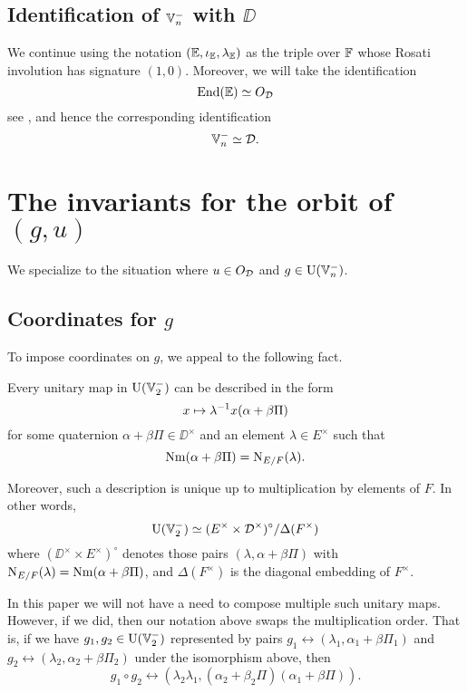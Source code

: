 \subsection{Identification of $\mathbb V_n^-$ with $\DD$}
We continue using the notation $(\mathbb E, \iota_\mathbb E, \lambda_\mathbb E)$ as the triple over $\mathbb F$
whose Rosati involution has signature $(1,0)$.
Moreover, we will take the identification
\[ \operatorname{End}(\mathbb E) \simeq O_\mathcal D \]
see \cite[Remark 2.5]{ref:KR},
and hence the corresponding identification
\[ \mathbb V_n^- \simeq \mathcal D. \]

\section{The invariants for the orbit of $(g,u)$}
\label{sec:g_u_invariants}

We specialize to the situation where $u \in O_\mathcal D$ and $g \in \operatorname{U}(\mathbb V_n^-)$.

\subsection{Coordinates for $g$}
To impose coordinates on $g$, we appeal to the following fact.
\begin{lemma}
  [Description of $\U(\VV_2^-)$]
  Every unitary map in $\U(\VV_2^-)$ can be described in the form
  \[ x \mapsto \lambda^{-1} x (\alpha + \beta \Pi) \]
  for some quaternion $\alpha + \beta \Pi \in \DD^\times$
  and an element $\lambda \in E^\times$ such that
  \[ \operatorname{Nm}(\alpha + \beta \Pi) = \operatorname{N}_{E/F}(\lambda). \]

  Moreover, such a description is unique up to multiplication by elements of $F$.
  In other words,
  \[ \operatorname{U}(\mathbb V_2^-) \simeq (E^\times \times \mathcal D^\times)^\circ / \Delta(F^\times) \]
  where $(\DD^\times \times E^\times)^\circ$
  denotes those pairs $(\lambda, \alpha + \beta \Pi)$
  with $\operatorname{N}_{E/F}(\lambda) = \operatorname{Nm}(\alpha + \beta \Pi)$,
  and $\Delta(F^\times)$ is the diagonal embedding of $F^\times$.
\end{lemma}
\begin{remark}
  In this paper we will not have a need to compose multiple such unitary maps.
  However, if we did, then our notation above swaps the multiplication order.
  That is, if we have $g_1, g_2 \in \operatorname{U}(\mathbb V_2^-)$ represented by pairs
  $g_1 \leftrightarrow (\lambda_1, \alpha_1 + \beta \Pi_1)$
  and $g_2 \leftrightarrow (\lambda_2, \alpha_2 + \beta \Pi_2)$
  under the isomorphism above, then
  \[ g_1 \circ g_2 \leftrightarrow (\lambda_2 \lambda_1, (\alpha_2 + \beta_2 \Pi)(\alpha_1 + \beta \Pi)). \]
\end{remark}

